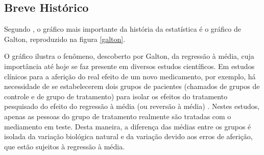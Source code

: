 \documentclass[a4paper, 12pt]{article}
\begin{document}
\hypertarget{breve-historico}{%
\subsection{Breve Histórico}\label{breve-historico}}

Segundo \textcite[p.~347]{koenker2000}, o gráfico mais importante da
história da estatística é o gráfico de Galton, reproduzido na figura
\ref{galton}.

O gráfico ilustra o fenômeno, descoberto por Galton, da regressão à
média, cuja importância até hoje se faz presente em diversos estudos
científicos. Em estudos clínicos para a aferição do real efeito de um
novo medicamento, por exemplo, há necessidade de se estabelecerem dois
grupos de pacientes (chamados de grupos de controle e de grupo de
tratamento) para isolar os efeitos do tratamento pesquisado do efeito do
regressão à média (ou reversão à média) \autocite[ver][]{james1973}.
Nestes estudos, apenas as pessoas do grupo de tratamento realmente são
tratadas com o mediamento em teste. Desta maneira, a diferença das
médias entre os grupos é isolada da variação biológica natural e da
variação devido aos erros de aferição, que estão sujeitos à regressão à
média.
\end{document}
